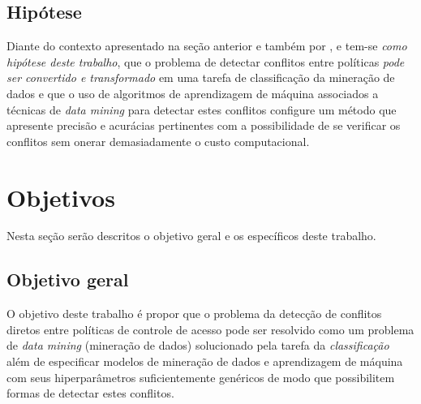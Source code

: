 \documentclass[
	12pt,				%
	openright,			%
	oneside,			%
	a4paper,			%
	english,			%
	french,				%
	spanish,			%
	brazil				%
	]{abntex2}
\begin{document}
\subsection{Hipótese}\label{hipótese}
Diante do contexto apresentado na seção anterior e também por ,  e  tem-se \textit{como hipótese deste trabalho}, que o problema de detectar conflitos entre políticas\textit{ pode ser convertido e transformado} em uma tarefa de classificação da mineração de dados e que o uso de algoritmos de aprendizagem de máquina associados a técnicas de \textit{data mining} para detectar estes conflitos configure um método que apresente precisão e acurácias pertinentes com a possibilidade de se verificar os conflitos sem onerar demasiadamente o custo computacional.

\section{Objetivos}\label{objetivos}
Nesta seção serão descritos o objetivo geral e os específicos deste trabalho.
\subsection{Objetivo geral}\label{objetivo_geral}
O objetivo deste trabalho é propor que o problema da detecção de conflitos diretos entre políticas de controle de acesso pode ser resolvido como um problema de \textit{data mining} (mineração de dados) solucionado pela tarefa da \textit{classificação} além de especificar modelos de mineração de dados e aprendizagem de máquina com seus hiperparâmetros suficientemente genéricos de modo que possibilitem formas de detectar estes conflitos.%
\end{document}

